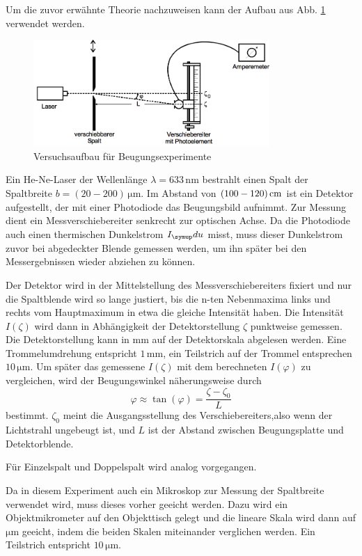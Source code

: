Um die zuvor erwähnte Theorie nachzuweisen kann der Aufbau aus Abb. \ref{fig:aufbau}
verwendet werden.
\begin{figure}
  \centering
  \includegraphics[width=0.8\textwidth]{bilder/aufbau.png}
  \caption{Versuchsaufbau für Beugungsexperimente \cite{406}}
  \label{fig:aufbau}
\end{figure}
Ein He-Ne-Laser der Wellenlänge $\lambda = 633 \,\si{\nano\meter}$ bestrahlt
einen Spalt der Spaltbreite $b = (20-200) \,\si{\micro\meter}$. Im Abstand von
$(100-120) \,\si{\centi\meter}$ ist ein Detektor aufgestellt, der mit einer Photodiode das
Beugungsbild aufnimmt. Zur Messung dient ein Messverschiebereiter senkrecht zur
optischen Achse. Da die Photodiode auch einen thermischen Dunkelstrom $I_\su{du}$
misst, muss dieser Dunkelstrom zuvor bei abgedeckter Blende gemessen werden, um ihn
später bei den Messergebnissen wieder abziehen zu können.

Der Detektor wird in der Mittelstellung des Messverschiebereiters fixiert und nur
die Spaltblende wird so lange justiert, bis die n-ten Nebenmaxima links und rechts
vom Hauptmaximum in etwa die gleiche Intensität haben.
Die Intensität $I(\zeta)$ wird dann in Abhängigkeit der Detektorstellung $\zeta$
punktweise gemessen. Die Detektorstellung kann in $\si{\milli\meter}$ auf der
Detektorskala abgelesen werden. Eine Trommelumdrehung entspricht $1\,\si{\milli\meter}$,
ein Teilstrich auf der Trommel entsprechen $10\,\si{\micro\meter}$.
Um später das gemessene $I(\zeta)$ mit dem berechneten $I(\varphi)$ zu vergleichen,
wird der Beugungswinkel näherungsweise durch
\begin{equation}
  \varphi \approx \tan{(\varphi)} = \frac{\zeta - \zeta_0}{L}
\end{equation}
bestimmt. $\zeta_0$ meint die Ausgangsstellung des Verschiebereiters,also wenn der
Lichtstrahl ungebeugt ist,
und $L$ ist der Abstand zwischen Beugungsplatte und Detektorblende.

Für Einzelspalt und Doppelspalt wird analog vorgegangen.

Da in diesem Experiment auch ein Mikroskop zur Messung der Spaltbreite verwendet
wird, muss dieses vorher geeicht werden. Dazu wird ein Objektmikrometer auf den
Objekttisch gelegt und die lineare Skala wird dann auf $\si{\micro\meter}$ geeicht,
indem die beiden Skalen miteinander verglichen werden. Ein Teilstrich entspricht
$10\,\si{\micro\meter}$.
